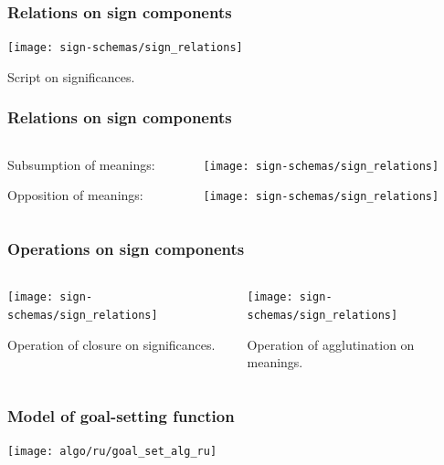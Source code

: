 \documentclass[default]{beamer}
\begin{document}
	\begin{frame}
		\frametitle{Relations on sign components}
		\centering
		\texttt{[image: sign-schemas/sign\_relations]}
		
		Script on significances.
	\end{frame}	

	\begin{frame}
		\frametitle{Relations on sign components}
		
		\begin{columns}
			\begin{column}{0.3\textwidth}
				\centering
				Subsumption of meanings: 
				\par\bigskip
				\par\bigskip
				\par\bigskip
				\par\bigskip
				\par\bigskip
				Opposition of meanings: 
				
			\end{column}
			\begin{column}{0.7\textwidth}
				\texttt{[image: sign-schemas/sign\_relations]}
				\par\bigskip
				\texttt{[image: sign-schemas/sign\_relations]}
			\end{column}
		\end{columns}
		
	\end{frame}	

	\begin{frame}
		\frametitle{Operations on sign components}
		
		\begin{columns}
			\begin{column}{0.5\textwidth}
				\centering
				\texttt{[image: sign-schemas/sign\_relations]}
				\par\bigskip
				Operation of closure on significances.
			\end{column}
			\begin{column}{0.5\textwidth}
				\texttt{[image: sign-schemas/sign\_relations]}
				\par\bigskip
				Operation of agglutination on meanings.
			\end{column}
		\end{columns}
	\end{frame}	

	\begin{frame}
		\frametitle{Model of goal-setting function}
		\centering
		\texttt{[image: algo/ru/goal\_set\_alg\_ru]}
	\end{frame}	
											
\end{document}
